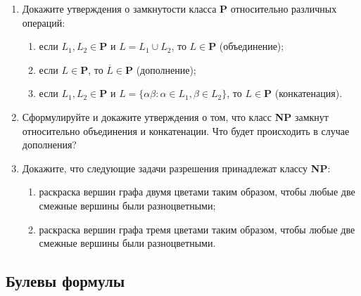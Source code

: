 \documentclass[12pt,a4paper]{article}
\begin{document}
\begin{enumerate}[itemsep=5pt]
\item Докажите утверждения о замкнутости класса \textbf P относительно различных операций:
  \begin{enumerate}
  \item если $L_1, L_2\in  \mathbf P$ и $L=L_1\cup L_2$, то $L\in \mathbf P$ (объединение);
  \item если $L\in \mathbf P$, то $\overline L\in \mathbf P$ (дополнение);
  \item если $L_1, L_2\in  \mathbf P$ и $L=\{\alpha\beta: \alpha\in L_1, \beta\in L_2\}$, то $L\in \mathbf P$ (конкатенация).
  \end{enumerate}

\item Сформулируйте и докажите утверждения о том, что класс \textbf{NP} замкнут относительно  объединения и конкатенации. Что будет происходить в случае дополнения?
\item Докажите, что следующие задачи разрешения принадлежат классу \textbf{NP}:
  \begin{enumerate}[topsep=0mm,itemsep=0mm]
  \item раскраска вершин графа двумя цветами таким образом, чтобы 
любые две смежные вершины были разноцветными;
\item  раскраска вершин графа тремя цветами таким образом, чтобы 
любые две смежные вершины были разноцветными.
  \end{enumerate}
\end{enumerate}

\subsection*{Булевы формулы}
\end{document}
